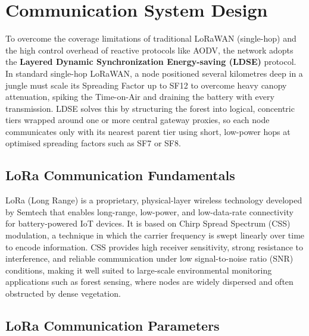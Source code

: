 \section{Communication System Design}

To overcome the coverage limitations of traditional LoRaWAN (single-hop) and the
high control overhead of reactive protocols like AODV, the network adopts the
\textbf{Layered Dynamic Synchronization Energy-saving (LDSE)} protocol.\cite{li2025ldse}
In standard single-hop LoRaWAN, a node positioned several kilometres deep in a
jungle must scale its Spreading Factor up to SF12 to overcome heavy canopy
attenuation, spiking the Time-on-Air and draining the battery with every
transmission. LDSE solves this by structuring the forest into logical, concentric
tiers wrapped around one or more central gateway proxies, so each node
communicates only with its nearest parent tier using short, low-power hops at
optimised spreading factors such as SF7 or SF8.


\subsection{LoRa Communication Fundamentals}

LoRa (Long Range) is a proprietary, physical-layer wireless technology developed
by Semtech that enables long-range, low-power, and low-data-rate connectivity for
battery-powered IoT devices. It is based on Chirp Spread Spectrum (CSS)
modulation, a technique in which the carrier frequency is swept linearly over time
to encode information. CSS provides high receiver sensitivity, strong resistance to
interference, and reliable communication under low signal-to-noise ratio (SNR)
conditions, making it well suited to large-scale environmental monitoring
applications such as forest sensing, where nodes are widely dispersed and often
obstructed by dense vegetation.


\subsection{LoRa Communication Parameters}

